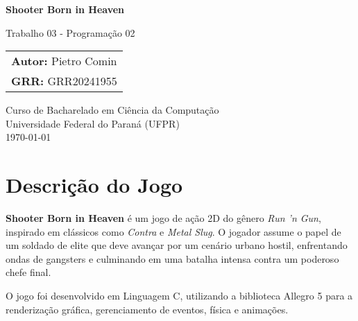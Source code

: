 \documentclass[11pt, a4paper]{article}
\begin{document}
\begin{titlepage}
    \centering %
    
    \vspace*{4cm} %
    
    {\Huge \bfseries Shooter Born in Heaven} %
    
    \vspace{1cm} %
    
    {\Large Trabalho 03 - Programação 02} %
    
    \vfill %
    
    {\large
    \begin{tabular}{l}
    \textbf{Autor:} Pietro Comin \\
    \textbf{GRR:} GRR20241955 \\
    \end{tabular}
    }
    
    \vfill %
    
    {\large
    Curso de Bacharelado em Ciência da Computação \\
    Universidade Federal do Paraná (UFPR) \\[1cm] %
    \today
    }
    
\end{titlepage}


\tableofcontents %
\newpage

\section{Descrição do Jogo}

\textbf{Shooter Born in Heaven} é um jogo de ação 2D do gênero \textit{Run 'n Gun}, inspirado em clássicos como \textit{Contra} e \textit{Metal Slug}. O jogador assume o papel de um soldado de elite que deve avançar por um cenário urbano hostil, enfrentando ondas de gangsters e culminando em uma batalha intensa contra um poderoso chefe final.

O jogo foi desenvolvido em Linguagem C, utilizando a biblioteca Allegro 5 para a renderização gráfica, gerenciamento de eventos, física e animações.
\end{document}
